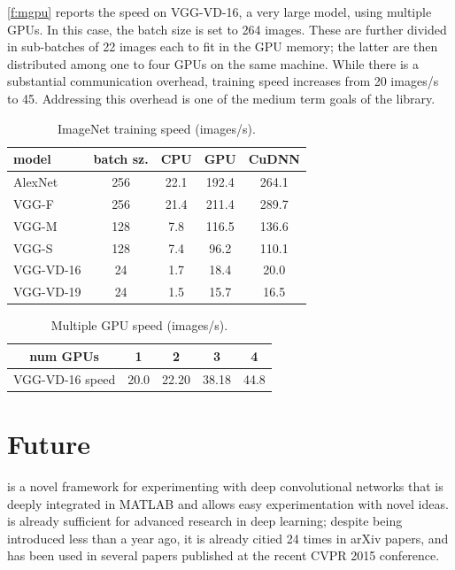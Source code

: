  \autoref{f:mgpu} reports the speed on VGG-VD-16, a very large model, using multiple GPUs. In this case, the batch size is set to 264 images. These are further divided in sub-batches of 22 images each to fit in the GPU memory; the latter are then distributed among one to four GPUs on the same machine. While there is a substantial communication overhead, training speed increases from 20 images/s to 45. Addressing this overhead is one of the medium term goals of the library.

\begin{table}
\centering
\begin{tabular}{|lc|ccc|}
  \hline
  model     & batch sz. & CPU  & GPU   & CuDNN \\
  \hline
  AlexNet   & 256       & 22.1 & 192.4 & 264.1 \\
  VGG-F     & 256       & 21.4 & 211.4 & 289.7 \\
  VGG-M     & 128       & 7.8  & 116.5 & 136.6 \\
  VGG-S     & 128       & 7.4  & 96.2  & 110.1 \\
  VGG-VD-16 & 24        & 1.7  & 18.4  & 20.0  \\
  VGG-VD-19 & 24        & 1.5  & 15.7  & 16.5  \\
  \hline
\end{tabular}
\caption{ImageNet training speed (images/s).}
\label{f:speed}
\end{table}

\begin{table}
\centering
\begin{tabular}{|c|cccc|}
  \hline
  num GPUs     & 1  & 2 & 3 & 4 \\
  \hline
  VGG-VD-16 speed & 20.0 & 22.20 & 38.18 & 44.8 \\
  \hline
\end{tabular}
\caption{Multiple GPU speed (images/s).}
\label{f:mgpu}
\end{table}


\section{Future}\label{s:future}

\matconvnet is a novel framework for experimenting with deep convolutional networks that is deeply integrated in MATLAB and allows easy experimentation with novel ideas.  \matconvnet is already sufficient for advanced research in deep learning; despite being introduced less than a year ago, it is already citied 24 times in arXiv papers, and has been used in several papers published at the recent CVPR 2015 conference. 

